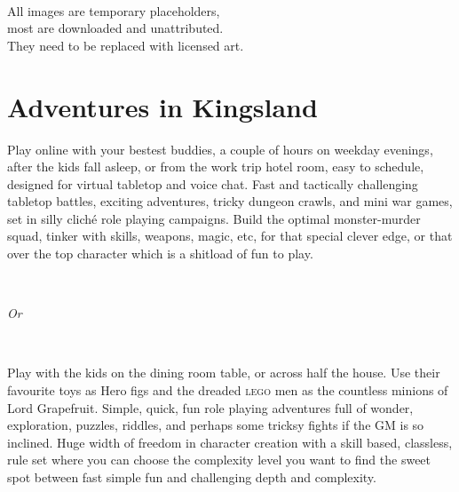 \

\noindent
All images are temporary placeholders, \\
most are downloaded and unattributed.\\
They need to be replaced with licensed art.

\normalsize






\cleardoublepage
\pagestyle{fancy}
\raggedbottom






\section*{Adventures in Kingsland}

\noindent
Play online with your bestest buddies, a couple of hours on weekday evenings, after the kids fall asleep, or from the work trip hotel room, easy to schedule, designed for virtual tabletop and voice chat.
Fast and tactically challenging tabletop battles, exciting adventures, tricky dungeon crawls, and mini war games, set in silly cliché role playing campaigns. 
Build the optimal monster-murder squad, tinker with skills, weapons, magic, etc, for that special clever edge, or that over the top character which is a shitload of fun to play.

\

\emph{Or}

\

\noindent
Play with the kids on the dining room table, or across half the house. Use their favourite toys as Hero figs and the dreaded \textsc{lego} men as the countless minions of Lord Grapefruit.
Simple, quick, fun role playing adventures full of wonder, exploration, puzzles, riddles, and perhaps some tricksy fights if the GM is so inclined. 
Huge width of freedom in character creation with a skill based, classless, rule set where you can choose the complexity level you want to find the sweet spot between fast simple fun and challenging depth and complexity.

